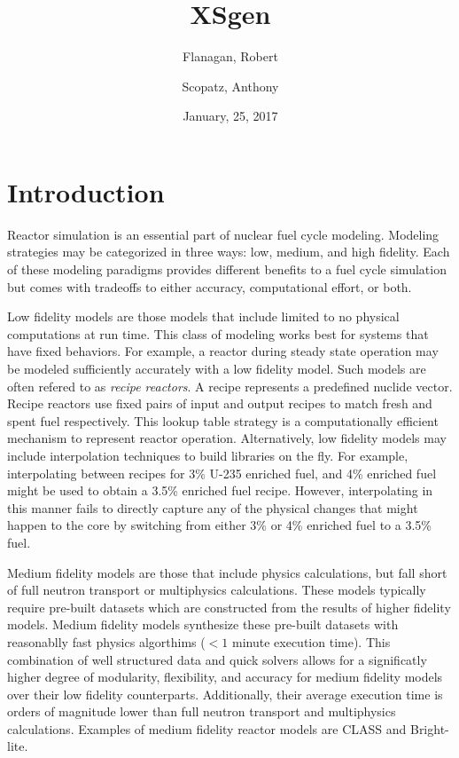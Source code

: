 \documentclass{article}
\begin{document}
\title{XSgen}
\date{January, 25, 2017}
\author{Flanagan, Robert \and Scopatz, Anthony}
\maketitle
\onehalfspacing

\section{Introduction}
Reactor simulation is an essential part of nuclear fuel cycle modeling. Modeling strategies
may be categorized in three ways: low, medium, and high fidelity. Each of these modeling
paradigms provides different benefits to a fuel cycle simulation but comes with tradeoffs to
either accuracy, computational effort, or both.

Low fidelity models are those models that include limited to no physical computations at run time.
This class of modeling works best for systems that have fixed behaviors. For example, a reactor
during steady state operation may be modeled sufficiently accurately with a low fidelity model.
Such models are often refered to as \emph{recipe reactors}. A recipe represents a predefined
nuclide vector. Recipe reactors use fixed pairs of input and output recipes to
match fresh and spent
fuel respectively. This lookup table strategy is a computationally efficient mechanism to
represent reactor operation. Alternatively, low fidelity models may include interpolation
techniques to build libraries on the fly. For example, interpolating between recipes for
3\% U-235 enriched fuel, and 4\% enriched fuel might be used to obtain a 3.5\% enriched
fuel recipe.
However, interpolating in this manner fails to directly capture any of the physical changes
that might happen to the core by switching from either 3\% or 4\% enriched fuel to a 3.5\% fuel.

Medium fidelity models are those that include physics calculations, but fall short of
full neutron transport or multiphysics calculations. These models typically require
pre-built datasets which are constructed from the results of higher fidelity models.
Medium fidelity models synthesize these pre-built datasets with reasonablly fast physics
algorthims ($<1$ minute execution time). This combination of well structured data and
quick solvers allows for a significatly higher degree of modularity, flexibility, and accuracy
for medium fidelity models over their low fidelity counterparts. Additionally, their average
execution time is orders of magnitude lower than full neutron transport and multiphysics
calculations. Examples of medium fidelity reactor models are CLASS\cite{class}
and Bright-lite\cite{brightlite,flanagan}.
\end{document}
